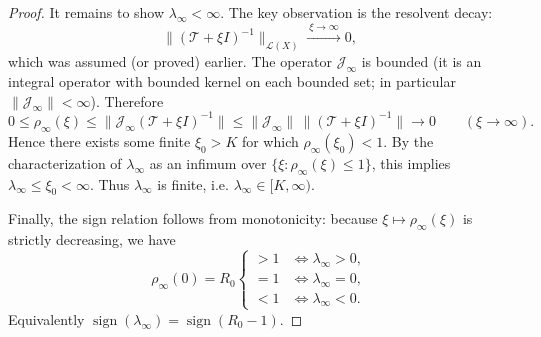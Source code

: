\documentclass[a4paper,11pt]{amsart}
\theoremstyle{definition}
\numberwithin{equation}{section}
\theoremstyle{definition}
\begin{document}
\begin{proof}
It remains to show \(\lambda_\infty<\infty\). The key observation is the resolvent decay:
\[
\|(\mathscr T+\xi I)^{-1}\|_{\mathcal L(X)}\xrightarrow{\ \xi\to\infty\ }0,
\]
which was assumed (or proved) earlier. The operator \(\mathscr J_\infty\) is bounded (it is an integral operator with bounded kernel on each bounded set; in particular \(\|\mathscr J_\infty\|<\infty\)). Therefore
\[
0\leq \rho_\infty(\xi)\leq \big\|\mathscr J_\infty(\mathscr T+\xi I)^{-1}\big\|
\leq \|\mathscr J_\infty\|\,\|(\mathscr T+\xi I)^{-1}\|
\longrightarrow 0\qquad(\xi\to\infty).
\]
Hence there exists some finite \(\xi_0>K\) for which \(\rho_\infty(\xi_0)<1\). By the characterization of \(\lambda_\infty\) as an infimum over \(\{\xi:\rho_\infty(\xi)\leq1\}\), this implies \(\lambda_\infty\leq\xi_0<\infty\). Thus \(\lambda_\infty\) is finite, i.e. \(\lambda_\infty\in[K,\infty)\).

Finally, the sign relation follows from monotonicity: because \(\xi\mapsto\rho_\infty(\xi)\) is strictly decreasing, we have
\[
\rho_\infty(0)=R_0 \begin{cases}
>1 &\Longleftrightarrow \lambda_\infty>0,\\
=1 &\Longleftrightarrow \lambda_\infty=0,\\
<1 &\Longleftrightarrow \lambda_\infty<0.
\end{cases}
\]
Equivalently \(\operatorname{sign}(\lambda_\infty)=\operatorname{sign}(R_0-1)\).
\end{proof}
\end{document}
